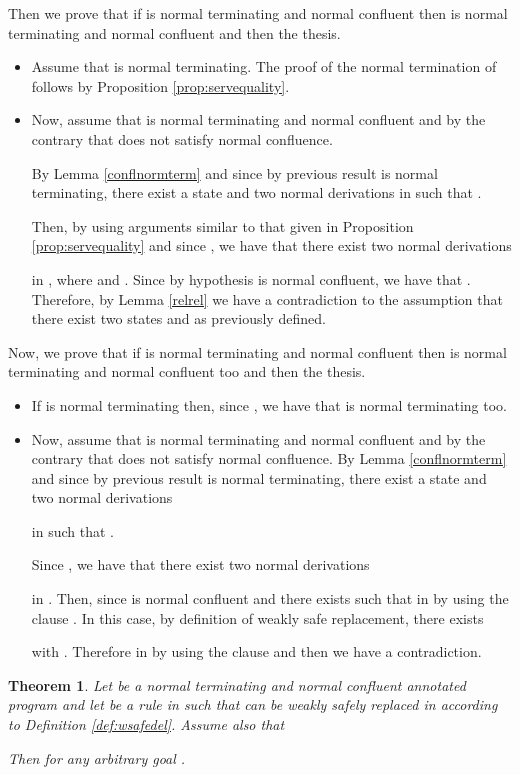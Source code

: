 \documentclass[final]{acmtrans2e}
\newtheorem{theorem}{Theorem}[section]
\begin{document}
   Then we prove that if  is normal terminating and
   normal confluent then  is normal terminating and normal confluent and then the thesis.
\begin{itemize}
   \item Assume that  is normal terminating.
  The proof of the normal termination of  follows by Proposition \ref{prop:servequality}.

   \item Now, assume that  is normal terminating and normal confluent and by the contrary that  does not satisfy normal confluence.


       By Lemma \ref{conflnormterm} and since by previous result  is normal terminating, there exist a state
 and two normal derivations
 in 
such that
.


Then, by using arguments similar to that given in Proposition \ref{prop:servequality} and since , we have that there exist two normal derivations

in , where
  and . Since by hypothesis  is normal confluent, we have that .
  Therefore, by Lemma \ref{relrel} we have a contradiction to the assumption that there exist two states  and  as previously defined.
 \end{itemize}


 \noindent Now, we prove that if  is normal terminating and normal confluent then  is normal terminating and normal confluent too and then the thesis.
 \begin{itemize}
   \item If  is normal terminating then, since , we have that
   is normal terminating too.
   \item Now, assume that  is normal terminating and normal confluent and  by the contrary that  does not satisfy normal confluence. By Lemma \ref{conflnormterm} and since by previous result  is normal terminating, there exist a state
 and two normal derivations

 in  such that
.


Since , we have that there exist two normal derivations

in . Then, since  is normal confluent and  there exists  such that
 in  by using the clause . In this case, by definition of weakly safe replacement, there exists

with . Therefore  in  by using the clause  and then we have a contradiction.
 \end{itemize}

\noindent{}

\begin{theorem}\label{prop:wqualified}
Let  be a normal terminating and normal confluent annotated program and let  be a rule in  such that
 can be weakly safely replaced
in  according to Definition \ref{def:wsafedel}. Assume also that


Then  for any arbitrary
goal .
\end{theorem}
\end{document}
